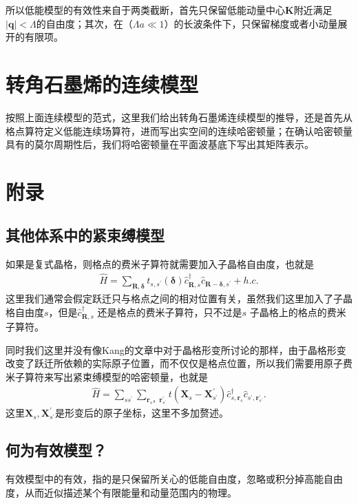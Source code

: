 \documentclass[10pt, oneside]{article}
\begin{document}
所以低能模型的有效性来自于两类截断，首先只保留低能动量中心\(\bm{K}\)附近满足\(\left|\bm{q}\right| < \Lambda\)的自由度；其次，在（\( \Lambda a \ll 1\)）的长波条件下，只保留梯度或者小动量展开的有限项。


\section{转角石墨烯的连续模型}

按照上面连续模型的范式，这里我们给出转角石墨烯连续模型的推导，还是首先从格点算符定义低能连续场算符，进而写出实空间的连续哈密顿量；在确认哈密顿量具有的莫尔周期性后，我们将哈密顿量在平面波基底下写出其矩阵表示。



\section{附录}
\subsection{其他体系中的紧束缚模型}
如果是复式晶格，则格点的费米子算符就需要加入子晶格自由度，也就是
\begin{align}
	\hat{H} = \sum_{\bm{R}, \bm{\delta}} t_{s,s^{\prime}} \left(\bm{\delta}\right) \hat{c}^{\dagger}_{\bm{R}, s} \hat{c}_{\bm{R} - \bm{\delta}, s^{\prime}} + h.c.
\end{align}
这里我们通常会假定跃迁只与格点之间的相对位置有关，虽然我们这里加入了子晶格自由度\(s\)，但是\(\hat{c}^{\dagger}_{\bm{R}, s} \) 还是格点的费米子算符，只不过是\(s\) 子晶格上的格点的费米子算符。

同时我们这里并没有像Kang的文章中对于晶格形变所讨论的那样，由于晶格形变改变了跃迁所依赖的实际原子位置，而不仅仅是格点位置，所以我们需要用原子费米子算符来写出紧束缚模型的哈密顿量，也就是
\begin{align}
	\hat{H} = \sum_{s s^{\prime}}\sum_{\bm{r}_{s}，\bm{r}^{\prime}_{s^{\prime}}} t\left(\bm{X}_{s} - \bm{X}^{\prime}_{s^{\prime}}\right) \hat{c}^{\dagger}_{s, \bm{r}_{s}}  \hat{c}_{s^{\prime}, \bm{r}^{\prime}_{s^{\prime}}}.
\end{align}
这里\(\bm{X}_{s}, \bm{X}^{\prime}_{s^{\prime}}\)是形变后的原子坐标，这里不多加赘述。

\subsection{何为有效模型？}
有效模型中的有效，指的是只保留所关心的低能自由度，忽略或积分掉高能自由度，从而近似描述某个有限能量和动量范围内的物理。
\end{document}
